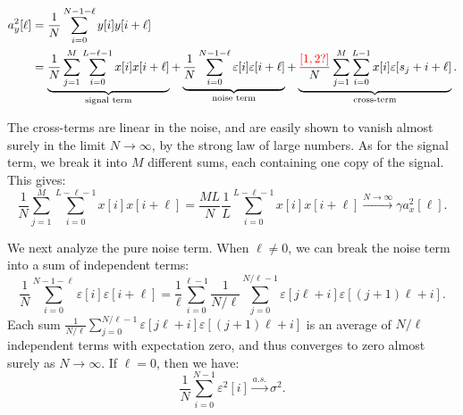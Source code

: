 \documentclass[english,11pt]{article}
\newcommand{\1}{\mathbf{1}}
\newcommand{\TODO}[1]{{\color{red}{[#1]}}}
\numberwithin{equation}{section}
\theoremstyle{plain}
\theoremstyle{definition}
\theoremstyle{remark}
\theoremstyle{plain}
\theoremstyle{remark}
\theoremstyle{plain}
\theoremstyle{plain}
\begin{document}
\begin{align}
%
a_y^2[\ell] & = \frac{1}{N}\sum_{i=0}^{N-1-\ell}y[i]y[i+\ell]
\nonumber \\
& = \underbrace{\frac{1}{N}\sum_{j=1}^{M}\sum_{i=0}^{L-\ell-1}x[i]x[i+\ell]}_{\text{signal term}} + \underbrace{\frac{1}{N}\sum_{i=0}^{N-1-\ell}\varepsilon[i]\varepsilon[i+\ell]}_{\text{noise term}}
+ \underbrace{\frac{\TODO{1,2?}}{N} \sum_{j=1}^{M} \sum_{i=0}^{L-1} x[i] \varepsilon[s_j + i + \ell]}_{\text{cross-term}}.
%
\end{align}

The cross-terms are linear in the noise, and are easily shown to vanish almost surely in the limit $N\to\infty$, by the strong law of large numbers. As for the signal term, we break it into $M$ different sums, each containing one copy of the signal. This gives:
%
\begin{equation} \label{eq:2nd_moment_signal_term}
%
\frac{1}{N}\sum_{j=1}^{M}\sum_{i=0}^{L-\ell-1}x[i]x[i+\ell] = \frac{ML}{N}\frac{1}{L}\sum_{i=0}^{L-\ell-1}x[i]x[i+\ell]\xrightarrow{N\to\infty}\gamma a_x^2[\ell].
%
\end{equation}
%

We next analyze the pure noise term. When $\ell\neq 0$, we can break the noise term into a sum of independent terms:
%
\begin{equation}
%
\frac{1}{N}\sum_{i=0}^{N-1-\ell} \varepsilon[i]\varepsilon[i+\ell] = \frac{1}{\ell}\sum_{i=0}^{\ell-1}\frac{1}{N/\ell}\sum_{j=0}^{N/\ell -1} \varepsilon[j\ell + i] \varepsilon[(j+1)\ell + i].
%
\end{equation}
%
Each sum $\frac{1}{N/\ell}\sum_{j=0}^{N/\ell -1} \varepsilon[j\ell + i] \varepsilon[(j+1)\ell + i]$ is an average of $N/\ell$ independent terms with expectation zero, and thus converges to zero almost surely as $N\to\infty$. If $\ell=0$, then we have:
%
\begin{equation}
%
\frac{1}{N}\sum_{i=0}^{N-1} \varepsilon^2[i] \xrightarrow{a.s.} \sigma^2.
%
\end{equation}
\end{document}
